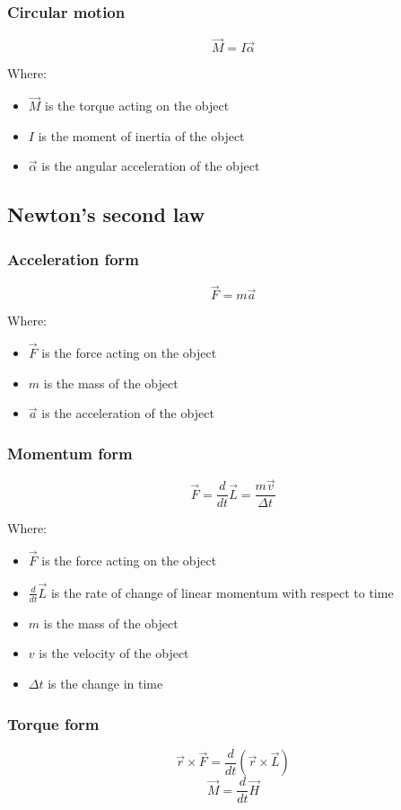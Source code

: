 \documentclass[11pt]{article}
\begin{document}
\subsubsection{Circular motion}
\label{sec:orgd14a23b}
\[\vec{M} = I \vec{\alpha}\]

Where:
\begin{itemize}
\item \(\vec{M}\) is the torque acting on the object
\item \(I\) is the moment of inertia of the object
\item \(\vec{\alpha}\) is the angular acceleration of the object
\end{itemize}
\subsection{Newton's second law}
\label{sec:orgcc373a0}

\subsubsection{Acceleration form}
\label{sec:org553918b}
\[\vec{F} = m \vec{a}\]

Where:
\begin{itemize}
\item \(\vec{F}\) is the force acting on the object
\item \(m\) is the mass of the object
\item \(\vec{a}\) is the acceleration of the object
\end{itemize}

 \newpage
\subsubsection{Momentum form}
\label{sec:orge15df19}
\[\vec{F} = \frac{d}{dt} \vec{L} = \frac{m \vec{v}}{\Delta t}\]

Where:
\begin{itemize}
\item \(\vec{F}\) is the force acting on the object
\item \(\frac{d}{dt} \vec{L}\) is the rate of change of linear momentum with respect to time
\item \(m\) is the mass of the object
\item \(v\) is the velocity of the object
\item \(\Delta t\) is the change in time
\end{itemize}
\subsubsection{Torque form}
\label{sec:orgef7530d}
\[\vec{r} \times \vec{F} = \frac{d}{dt} \left(\vec{r} \times \vec{L} \right)\]
\[\vec{M} = \frac{d}{dt} \vec{H}\]
\end{document}
